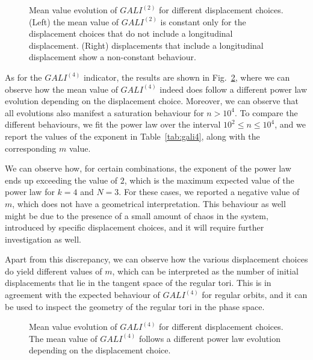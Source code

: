 \begin{figure}
    \centering
    \caption{Mean value evolution of $GALI^{(2)}$ for different displacement choices. (Left) the mean value of $GALI^{(2)}$ is constant only for the displacement choices that do not include a longitudinal displacement. (Right) displacements that include a longitudinal displacement show a non-constant behaviour.}
    \label{fig:gali2}
\end{figure}

As for the $GALI^{(4)}$ indicator, the results are shown in Fig.~\ref{fig:gali4}, where we can observe how the mean value of $GALI^{(4)}$ indeed does follow a different power law evolution depending on the displacement choice. Moreover, we can observe that all evolutions also manifest a saturation behaviour for $n>10^4$. To compare the different behaviours, we fit the power law over the interval $10^2\leq n \leq 10^4$, and we report the values of the exponent in Table~\ref{tab:gali4}, along with the corresponding $m$ value.

We can observe how, for certain combinations, the exponent of the power law ends up exceeding the value of $2$, which is the maximum expected value of the power law for $k=4$ and $N=3$. For these cases, we reported a negative value of $m$, which does not have a geometrical interpretation. This behaviour as well might be due to the presence of a small amount of chaos in the system, introduced by specific displacement choices, and it will require further investigation as well.

Apart from this discrepancy, we can observe how the various displacement choices do yield different values of $m$, which can be interpreted as the number of initial displacements that lie in the tangent space of the regular tori. This is in agreement with the expected behaviour of $GALI^{(4)}$ for regular orbits, and it can be used to inspect the geometry of the regular tori in the phase space.

\begin{figure}
    \centering
    \caption{Mean value evolution of $GALI^{(4)}$ for different displacement choices. The mean value of $GALI^{(4)}$ follows a different power law evolution depending on the displacement choice.}
    \label{fig:gali4}
\end{figure}

